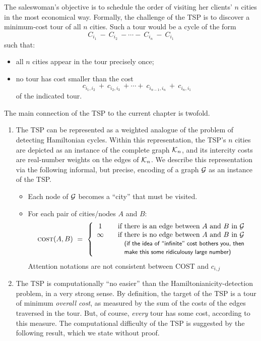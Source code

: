 The saleswoman's objective is to schedule the order of visiting her
clients' $n$ cities in the most economical way.  Formally, the
challenge of the TSP is to discover a minimum-cost tour of all $n$
cities.  Such a tour would be a cycle of the form
\[ C_{i_1} \ - \ C_{i_2} \ - \cdots - \ C_{i_n} \ - \ C_{i_1} \]
such that:
\begin{itemize}
\item
all $n$ cities appear in the tour precisely once;
\item
no tour has cost smaller than the cost
\[ c_{i_1,i_2} \ + \ c_{i_2, i_3} \ + \cdots + \  
c_{i_{n-1}, i_n} \ + \ c_{i_n, i_1} \]
of the indicated tour.
\end{itemize}
The main connection of the TSP to the current chapter is twofold.
\begin{enumerate}
\item
The TSP can be represented as a weighted analogue of the problem of
detecting Hamiltonian cycles.  Within this representation, the TSP's
$n$ cities are depicted as an instance of the complete graph $\mbox{$\cal K$}_n$,
and its intercity costs are real-number weights on the edges of
$\mbox{$\cal K$}_n$.  We describe this representation via the following informal,
but precise, encoding of a graph $\mbox{$\cal G$}$ as an instance of the TSP.
  \begin{itemize}
  \item
Each node of $\mbox{$\cal G$}$ becomes a ``city'' that must be visited.
  \item
For each pair of cities/nodes $A$ and $B$:
\[ \mbox{\sc cost}(A,B) \ = \ \left\{
\begin{array}{ccl}
1 & & \mbox{if there is an edge between $A$ and $B$ in $\g$} \\
\infty & & \mbox{if there is no edge between $A$ and $B$ in $\g$} \\
       & & \mbox{\small\sf (if the idea of ``infinite'' cost bothers
  you, then} \\
       & & \mbox{\small\sf make this some ridiculousy large number)}
\end{array}
\right.
\]
{\Denis Attention notations are not consistent between COST and $c_{i,j}$}
  \end{itemize}

\item
The TSP is computationally ``no easier'' than the
Hamiltonianicity-detection problem, in a very strong sense.  By
definition, the target of the TSP is a tour of minimum {\em overall
  cost}, as measured by the sum of the costs of the edges traversed in
the tour.  But, of course, {\em every} tour has some cost, according
to this measure.  The computational difficulty of the TSP is suggested
by the following result, which we state without proof.
\end{enumerate}

